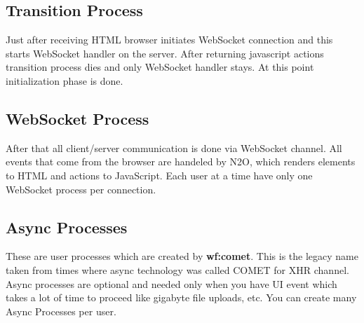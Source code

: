 \subsection{Transition Process}
Just after receiving HTML browser initiates WebSocket connection
and this starts WebSocket handler on the server. After returning
javascript actions transition process dies and only WebSocket handler stays.
At this point initialization phase is done.

\subsection{WebSocket Process}
After that all client/server communication is done via WebSocket channel.
All events that come from the browser are handeled by N2O, which renders elements
to HTML and actions to JavaScript. Each user at a time have only one WebSocket process per connection.

\subsection{Async Processes}
These are user processes which are created by {\bf wf:comet}. This is the legacy name
taken from times where async technology was called COMET for XHR channel. Async processes
are optional and needed only when you have UI event which takes a lot of time to proceed
like gigabyte file uploads, etc. You can create many Async Processes per user.

